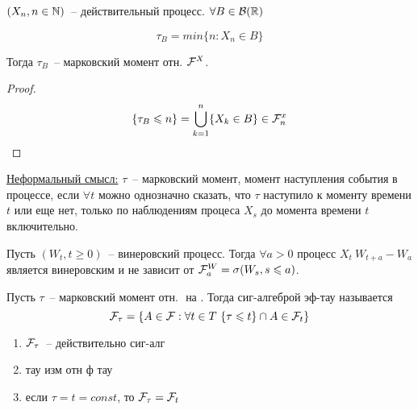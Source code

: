 \begin{example}
$(X_n, n \in \mathbb{N})$~-- действительный процесс. $\forall B \in \mathcal{B}(\mathbb{R})$

$$\tau_B = min\{n: X_n \in B\}$$

Тогда $\tau_B$~-- марковский момент отн. $\mathcal{F}^X$.
\end{example}
\begin{proof}
$$\{\tau_B \leqslant n\} = \bigcup_{k = 1}^{n}\{X_k \in B\} \in \mathcal{F}_n^x$$
\end{proof}

\underline{Неформальный смысл:} $\tau$~-- марковский момент, момент наступления
события в процессе, если $\forall t$ можно однозначно сказать, что $\tau$ наступило
к моменту времени $t$ или еще нет, только по наблюдениям процеса $X_s$ до момента времени
$t$ включительно.

\begin{theorem}
Пусть $(W_t, t \geq 0)$~-- винеровский процесс. Тогда
$\forall a > 0$ процесс $X_t \ W_{t+a} - W_a$ является винеровским и
не зависит от $\mathcal{F}_a^W = \sigma(W_s, s \leqslant a)$.
\end{theorem}

\begin{definition}
Пусть $\tau$~-- марковский момент отн. $ $ на $ $. Тогда сиг-алгеброй эф-тау
называется
$$\myF_\tau = \{A \in \myF: \forall t \in T \ \{\tau \leq t\} \cap A \in \myF_t\}$$
\end{definition}
\begin{enumerate}
\item $\mathcal{F}_\tau$~-- действительно сиг-алг
\item тау изм отн ф тау
\item если $\tau = t = const$, то $\mathcal{F}_\tau = \mathcal{F}_t$
\end{enumerate}

